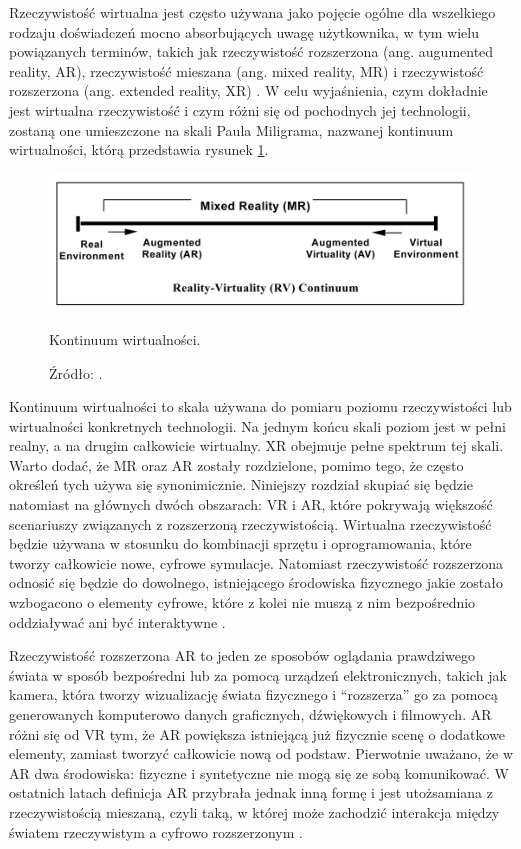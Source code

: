 Rzeczywistość wirtualna jest często używana jako pojęcie ogólne dla wszelkiego rodzaju doświadczeń mocno absorbujących uwagę użytkownika, w tym wielu powiązanych terminów, takich jak rzeczywistość rozszerzona (ang. augumented reality, AR), rzeczywistość mieszana (ang. mixed reality, MR)  i rzeczywistość rozszerzona (ang. extended reality, XR) \citep{virtualfor}. W celu wyjaśnienia, czym dokładnie jest wirtualna rzeczywistość i czym różni się od pochodnych jej technologii, zostaną one umieszczone na skali Paula Miligrama, nazwanej kontinuum wirtualności, którą przedstawia rysunek \ref{fig:continuum}.

\begin{figure}[h]
	\centering
	\includegraphics[width=1\textwidth]{images/2.spektrum.png}
	\caption{Kontinuum wirtualności.}
	\caption*{Źródło: \citep[s.~14]{virtualfor}.}
	\label{fig:continuum}
\end{figure}

Kontinuum wirtualności to skala używana do pomiaru poziomu rzeczywistości lub wirtualności konkretnych technologii. Na jednym końcu skali poziom jest w pełni realny, a na drugim całkowicie wirtualny. XR obejmuje pełne spektrum tej skali. Warto dodać, że MR oraz AR zostały rozdzielone, pomimo tego, że często określeń tych używa się synonimicznie. Niniejszy rozdział skupiać się będzie natomiast na głównych dwóch obszarach: VR i AR, które pokrywają większość scenariuszy związanych z rozszerzoną rzeczywistością.  Wirtualna rzeczywistość będzie używana w stosunku do kombinacji sprzętu i oprogramowania, które tworzy całkowicie nowe, cyfrowe symulacje. Natomiast rzeczywistość rozszerzona odnosić się będzie do dowolnego, istniejącego środowiska fizycznego jakie zostało wzbogacono o elementy cyfrowe, które z kolei nie muszą z nim bezpośrednio oddziaływać ani być interaktywne \citep{virtualfor}.

Rzeczywistość rozszerzona AR to jeden ze sposobów oglądania prawdziwego świata w sposób bezpośredni lub za pomocą urządzeń elektronicznych, takich jak kamera, która tworzy wizualizację świata fizycznego i ``rozszerza'' go za pomocą generowanych komputerowo danych graficznych, dźwiękowych i filmowych. AR różni się od VR tym, że AR powiększa istniejącą już fizycznie scenę o dodatkowe elementy, zamiast tworzyć całkowicie nową od podstaw. Pierwotnie uważano, że w AR dwa środowiska: fizyczne i syntetyczne nie mogą się ze sobą komunikować. W ostatnich latach definicja AR przybrała jednak inną formę i jest utożsamiana z rzeczywistością mieszaną, czyli taką, w której może zachodzić interakcja między światem rzeczywistym a cyfrowo rozszerzonym \citep{virtualfor}.

